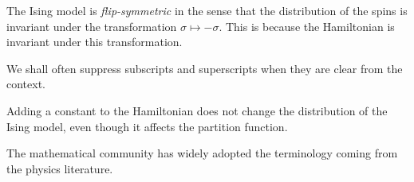 \begin{remark}
    The Ising model is \emph{flip-symmetric} in the sense that the distribution of the spins is invariant under the transformation $\sigma\mapsto-\sigma$.
    This is because the Hamiltonian is invariant under this transformation.
\end{remark}

\begin{remark}
    We shall often suppress subscripts and superscripts when they are clear from the context.
\end{remark}

\begin{remark}
    Adding a constant to the Hamiltonian does not change the distribution of the Ising model,
    even though it affects the partition function.
\end{remark}

\begin{remark}
    The mathematical community has widely adopted the terminology coming from the physics
    literature.
\end{remark}

